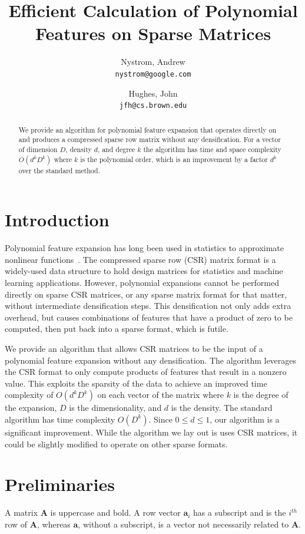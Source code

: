 \documentclass{article} %
\title{Efficient Calculation of Polynomial Features on Sparse Matrices}
\author{
  Nystrom, Andrew \\
  \texttt{nystrom@google.com}
  \and
  Hughes, John \\
  \texttt{jfh@cs.brown.edu}
}
\begin{document}
\maketitle

\begin{abstract}
We provide an algorithm for polynomial feature expansion that operates directly on and produces a compressed sparse row matrix without any densification.
For a vector of dimension $D$, density $d$, and degree $k$ the algorithm has time and space complexity $O(d^kD^k)$ where $k$ is the polynomial order, which is an improvement by a factor $d^k$ over the standard method.
\end{abstract}

\section{Introduction}

Polynomial feature expansion has long been used in statistics to approximate nonlinear functions~\cite{gergonne1974application, smith1918standard}.
The compressed sparse row (CSR) matrix format is a widely-used data structure to hold design matrices for statistics and machine learning applications.
However, polynomial expansions cannot be performed directly on sparse CSR matrices, or any sparse matrix format for that matter, without intermediate densification steps.
This densification not only adds extra overhead, but causes combinations of features that have a product of zero to be computed, then put back into a sparse format, which is futile.

We provide an algorithm that allows CSR matrices to be the input of a polynomial feature expansion without any densification.
The algorithm leverages the CSR format to only compute products of features that result in a nonzero value.
This exploits the sparsity of the data to achieve an improved time complexity of $O(d^kD^k)$ on each vector of the matrix where $k$ is the degree of the expansion, $D$ is the dimensionality, and $d$ is the density.
The standard algorithm has time complexity $O(D^k)$.
Since $0 \le d \le 1$, our algorithm is a significant improvement.
While the algorithm we lay out is uses CSR matrices, it could be slightly modified to operate on other sparse formats.

\section{Preliminaries}
A matrix $\bm{A}$ is uppercase and bold.
A row vector $\bm{a}_i$ has a subscript and is the $i^{th}$ row of $\bm{A}$, whereas $\bm{a}$, without a subscript, is a vector not necessarily related to $\bm{A}$.
\end{document}
